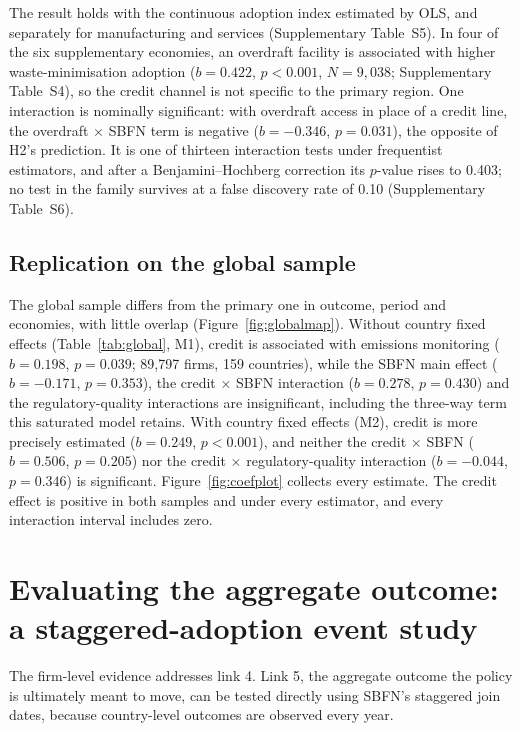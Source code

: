 \documentclass[review,authoryear,12pt]{elsarticle}
\begin{document}
The result holds with the continuous adoption index estimated by OLS, and separately for manufacturing and services (Supplementary Table~S5). In four of the six supplementary economies, an overdraft facility is associated with higher waste-minimisation adoption ($b=0.422$, $p<0.001$, $N=9{,}038$; Supplementary Table~S4), so the credit channel is not specific to the primary region. One interaction is nominally significant: with overdraft access in place of a credit line, the overdraft $\times$ SBFN term is negative ($b=-0.346$, $p=0.031$), the opposite of H2's prediction. It is one of thirteen interaction tests under frequentist estimators, and after a Benjamini--Hochberg correction its $p$-value rises to 0.403; no test in the family survives at a false discovery rate of 0.10 (Supplementary Table~S6).

\subsection{Replication on the global sample}
\label{sec:global}

The global sample differs from the primary one in outcome, period and economies, with little overlap (Figure~\ref{fig:globalmap}). Without country fixed effects (Table~\ref{tab:global}, M1), credit is associated with emissions monitoring ($b=0.198$, $p=0.039$; 89{,}797 firms, 159 countries), while the SBFN main effect ($b=-0.171$, $p=0.353$), the credit $\times$ SBFN interaction ($b=0.278$, $p=0.430$) and the regulatory-quality interactions are insignificant, including the three-way term this saturated model retains. With country fixed effects (M2), credit is more precisely estimated ($b=0.249$, $p<0.001$), and neither the credit $\times$ SBFN ($b=0.506$, $p=0.205$) nor the credit $\times$ regulatory-quality interaction ($b=-0.044$, $p=0.346$) is significant. Figure~\ref{fig:coefplot} collects every estimate. The credit effect is positive in both samples and under every estimator, and every interaction interval includes zero.

\section{Evaluating the aggregate outcome: a staggered-adoption event study}
\label{sec:macrodid}

The firm-level evidence addresses link 4. Link 5, the aggregate outcome the policy is ultimately meant to move, can be tested directly using SBFN's staggered join dates, because country-level outcomes are observed every year.
\end{document}
